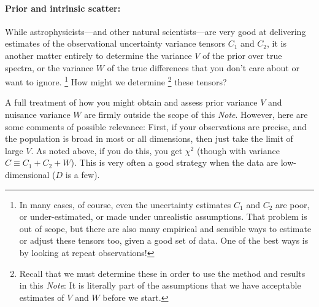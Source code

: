 \documentclass[12pt,letterpaper]{article}
\newcommand{\documentname}{\textsl{Note}}
\begin{document}
\paragraph{Prior and intrinsic scatter:}
While astrophysicists---and other natural scientists---are
very good at delivering estimates
of the observational uncertainty variance tensors $C_1$ and $C_2$, it
is another matter entirely to determine the variance $V$ of the prior
over true spectra, or the variance $W$ of the true differences that
you don't care about or want to ignore.%
\footnote{In many cases, of course, even the uncertainty estimates
  $C_1$ and $C_2$ are poor, or under-estimated, or made under
  unrealistic assumptions. That problem is out of scope, but there are
  also many empirical and sensible ways to estimate or adjust these
  tensors too, given a good set of data. One of the best ways is by
  looking at repeat observations!}
How might we determine%
\footnote{Recall that we must determine these in order to use the
  method and results in this \documentname: It is literally part of
  the assumptions that we have acceptable estimates of $V$ and $W$
  before we start.} these tensors?

A full treatment of how you might obtain and assess prior variance $V$
and nuisance variance $W$ are firmly outside the scope of this
\documentname. However, here are some comments of possible relevance:
First, if your observations are precise, and the population is broad
in most or all dimensions, then just take the limit of large $V$. As
noted above, if you do this, you get $\chi^2$ (though with variance
$C\equiv C_1 + C_2 + W$). This is very often a good strategy when the
data are low-dimensional ($D$ is a few).
\end{document}
